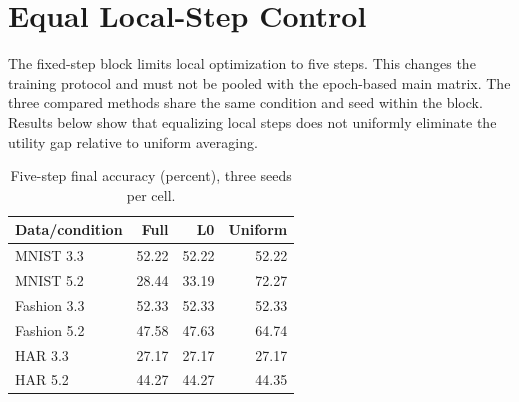 \documentclass[journal]{IEEEtran}
\begin{document}
\section{Equal Local-Step Control}
The fixed-step block limits local optimization to five steps. This changes the training protocol and must not be pooled with the epoch-based main matrix. The three compared methods share the same condition and seed within the block. Results below show that equalizing local steps does not uniformly eliminate the utility gap relative to uniform averaging.
\begin{table}[!t]
\centering\scriptsize
\caption{Five-step final accuracy (percent), three seeds per cell.}
\begin{tabular}{lrrr}
\toprule
Data/condition & Full & L0 & Uniform \\
\midrule
MNIST 3.3 & 52.22 & 52.22 & 52.22 \\
MNIST 5.2 & 28.44 & 33.19 & 72.27 \\
Fashion 3.3 & 52.33 & 52.33 & 52.33 \\
Fashion 5.2 & 47.58 & 47.63 & 64.74 \\
HAR 3.3 & 27.17 & 27.17 & 27.17 \\
HAR 5.2 & 44.27 & 44.27 & 44.35 \\
\bottomrule
\end{tabular}
\end{table}
\end{document}
